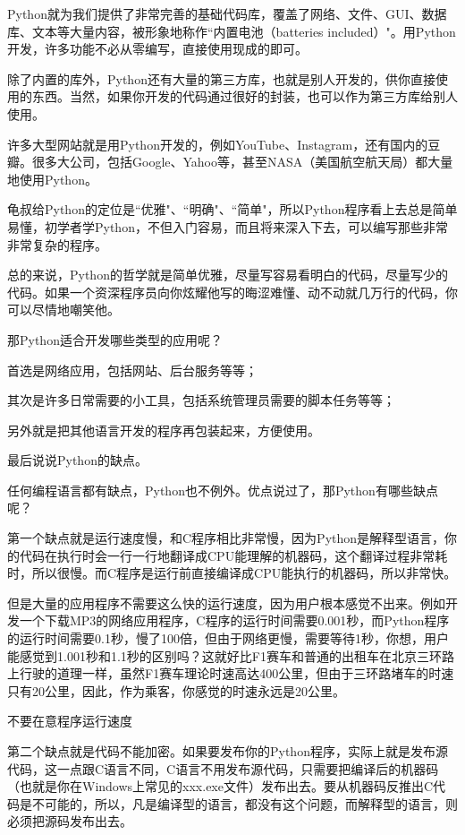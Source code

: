Python就为我们提供了非常完善的基础代码库，覆盖了网络、文件、GUI、数据库、文本等大量内容，被形象地称作``内置电池（batteries included）"。用Python开发，许多功能不必从零编写，直接使用现成的即可。

除了内置的库外，Python还有大量的第三方库，也就是别人开发的，供你直接使用的东西。当然，如果你开发的代码通过很好的封装，也可以作为第三方库给别人使用。

许多大型网站就是用Python开发的，例如YouTube、Instagram，还有国内的豆瓣。很多大公司，包括Google、Yahoo等，甚至NASA（美国航空航天局）都大量地使用Python。

龟叔给Python的定位是``优雅"、``明确"、``简单"，所以Python程序看上去总是简单易懂，初学者学Python，不但入门容易，而且将来深入下去，可以编写那些非常非常复杂的程序。

总的来说，Python的哲学就是简单优雅，尽量写容易看明白的代码，尽量写少的代码。如果一个资深程序员向你炫耀他写的晦涩难懂、动不动就几万行的代码，你可以尽情地嘲笑他。

那Python适合开发哪些类型的应用呢？

首选是网络应用，包括网站、后台服务等等；

其次是许多日常需要的小工具，包括系统管理员需要的脚本任务等等；

另外就是把其他语言开发的程序再包装起来，方便使用。

最后说说Python的缺点。

任何编程语言都有缺点，Python也不例外。优点说过了，那Python有哪些缺点呢？

第一个缺点就是运行速度慢，和C程序相比非常慢，因为Python是解释型语言，你的代码在执行时会一行一行地翻译成CPU能理解的机器码，这个翻译过程非常耗时，所以很慢。而C程序是运行前直接编译成CPU能执行的机器码，所以非常快。

但是大量的应用程序不需要这么快的运行速度，因为用户根本感觉不出来。例如开发一个下载MP3的网络应用程序，C程序的运行时间需要0.001秒，而Python程序的运行时间需要0.1秒，慢了100倍，但由于网络更慢，需要等待1秒，你想，用户能感觉到1.001秒和1.1秒的区别吗？这就好比F1赛车和普通的出租车在北京三环路上行驶的道理一样，虽然F1赛车理论时速高达400公里，但由于三环路堵车的时速只有20公里，因此，作为乘客，你感觉的时速永远是20公里。

不要在意程序运行速度

第二个缺点就是代码不能加密。如果要发布你的Python程序，实际上就是发布源代码，这一点跟C语言不同，C语言不用发布源代码，只需要把编译后的机器码（也就是你在Windows上常见的xxx.exe文件）发布出去。要从机器码反推出C代码是不可能的，所以，凡是编译型的语言，都没有这个问题，而解释型的语言，则必须把源码发布出去。

